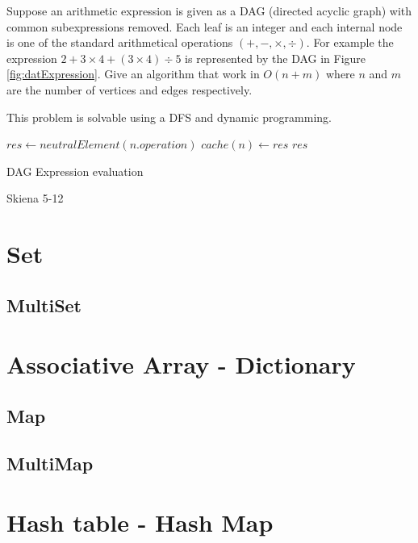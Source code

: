 \begin{problem}
Suppose an arithmetic expression is given as a DAG (directed acyclic graph)
with common subexpressions removed. Each leaf is an integer and each internal node is one of the standard arithmetical operations $(+, -, \times, \div )$.
For example the expression $2+3 \times 4 + (3 \times 4) \div 5$ is represented by the DAG in Figure \ref{fig:datExpression}. Give an algorithm that work in $O(n+m)$ where $n$ and $m$ are the number of vertices and edges respectively.


\begin{solution}
This problem is solvable using a DFS and dynamic programming.

\begin{algorithm}
  $res \gets neutralElement(n.operation)$\;
  $cache(n) \gets res$\;
  \Return $res$\;
 
\caption{DAG Expression evaluation}
\end{algorithm}


\end{solution}

\end{problem}


\begin{problem}
Skiena 5-12	

\begin{solution}



\end{solution}

\end{problem}




\chapter{Set}
\section{MultiSet}

\chapter{Associative Array - Dictionary}
\section{Map}
\section{MultiMap}
\chapter{Hash table - Hash Map}
	
\iffalse
http://www.tommyds.it/doc/benchmark.html
\fi